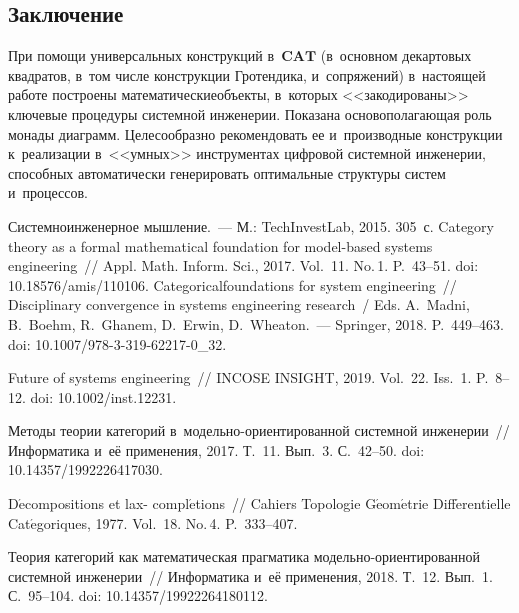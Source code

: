 \begin{multicols}{2}
\section{Заключение}
     
     При помощи универсальных конструкций в~$\mathbf{CAT}$ (в~основном 
декартовых квадратов, в~том чис\-ле конструкции Гротендика, и~сопряжений) 
в~настоящей работе построены математические\linebreak объекты, в~которых 
<<закодированы>> ключевые процедуры системной инженерии. Показана 
основополагающая роль монады диаграмм. Целесообразно рекомендовать ее и~производные \mbox{конструкции}
 к~реализации в~<<умных>> инструментах цифровой 
системной инженерии, способных автоматически генерировать оптимальные 
структуры систем и~процессов.
     
{\small\frenchspacing
 {%
 \begin{thebibliography}{99}
 Системноинженерное мышление.~--- М.: TechInvestLab, 2015. 305~с.
 Category theory as a formal mathematical foundation for  
model-based systems engineering~// Appl. Math. Inform. Sci., 2017. Vol.~11. No.\,1. P.~43--51. 
doi: 10.18576/amis/110106.
    Categorical\linebreak foundations for system engineering~// 
Disciplinary convergence in systems engineering research~/ Eds. A.~Madni, B.~Boehm, 
R.~Ghanem, D.~Erwin, D.~Wheaton.~--- Springer, 2018. P.~449--463. doi:  
10.1007/978-3-319-62217-0\_32.

    Future of systems engineering~// INCOSE INSIGHT, 2019. Vol.~22. 
Iss.~1. P.~8--12. doi: 10.1002/\linebreak inst.12231.

    Методы теории категорий в~модельно-ориентированной системной 
инженерии~// Информатика и~её применения, 2017. Т.~11. Вып.~3. С.~42--50. doi: 
10.14357/1992226417030.

 D$\acute{\mbox{e}}$compositions et lax-
compl$\acute{\mbox{e}}$tions~// Cahiers Topologie 
G$\acute{\mbox{e}}$om$\acute{\mbox{e}}$trie Diff$\acute{\mbox{e}}$rentielle 
Cat$\acute{\mbox{e}}$goriques, 1977. Vol.~18. No.\,4. P.~333--407.

    Теория категорий как математическая прагматика  
мо\-дель\-но-ори\-ен\-ти\-ро\-ван\-ной сис\-тем\-ной инженерии~// Информатика и~её 
применения, 2018. Т.~12. Вып.~1. С.~95--104. doi: 10.14357/19922264180112.


\end{thebibliography}}}
\end{multicols}
